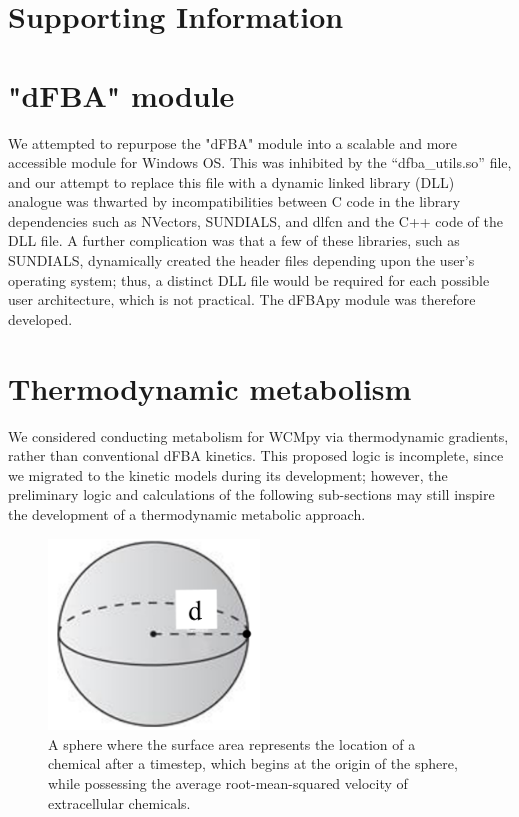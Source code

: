 
\begin{supplementary}

\section{Supporting Information}

\section{"dFBA" module}
We attempted to repurpose the "dFBA" module into a scalable and more accessible module for Windows OS. This was inhibited by the “dfba\_utils.so” file, and our attempt to replace this file with a dynamic linked library (DLL) analogue was thwarted by incompatibilities between C code in the library dependencies such as NVectors, SUNDIALS, and dlfcn and the C++ code of the DLL file. A further complication was that a few of these libraries, such as SUNDIALS, dynamically created the header files depending upon the user’s operating system; thus, a distinct DLL file would be required for each possible user architecture, which is not practical. The dFBApy module was therefore developed. 

\section{Thermodynamic metabolism}
We considered conducting metabolism for WCMpy via thermodynamic gradients, rather than conventional dFBA kinetics. This proposed logic is incomplete, since we migrated to the kinetic models during its development; however, the preliminary logic and calculations of the following sub-sections may still inspire the development of a thermodynamic metabolic approach.  


\begin{figure}
    \centering
    \includegraphics[width = 0.5\textwidth]{images/WCMpy/diffusion_sphere.png}
    \caption{
        A sphere where the surface area represents the location of a chemical after a timestep, which begins at the origin of the sphere, while possessing the average root-mean-squared velocity of extracellular chemicals.
    }
    \label{diffusion_sphere}
\end{figure}


\end{supplementary}
